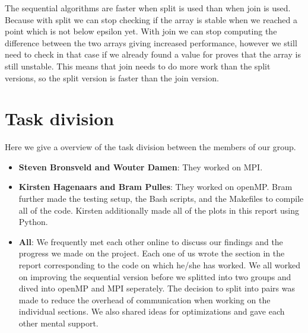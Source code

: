\documentclass[a4paper]{article}
\begin{document}
The sequential algorithms are faster when split is used than when join is used. Because with split we can stop checking if the array is stable when we reached a point which is not below epsilon yet. With join we can stop computing the difference between the two arrays giving increased performance, however we still need to check in that case if we already found a value for proves that the array is still unstable. This means that join needs to do more work than the split versions, so the split version is faster than the join version.


\section{Task division}
Here we give a overview of the task division between the members of our group.
\begin{itemize}
    \item \textbf{Steven Bronsveld and Wouter Damen}: They worked on MPI.
    \item \textbf{Kirsten Hagenaars and Bram Pulles}: They worked on openMP. Bram further made the testing setup, the Bash scripts, and the Makefiles to compile all of the code. Kirsten additionally made all of the plots in this report using Python.
    \item \textbf{All}: We frequently met each other online to discuss our findings and the progress we made on the project. Each one of us wrote the section in the report corresponding to the code on which he/she has worked. We all worked on improving the sequential version before we splitted into two groups and dived into openMP and MPI seperately. The decision to split into pairs was made to reduce the overhead of communication when working on the individual sections. We also shared ideas for optimizations and gave each other mental support.
\end{itemize}
\end{document}
